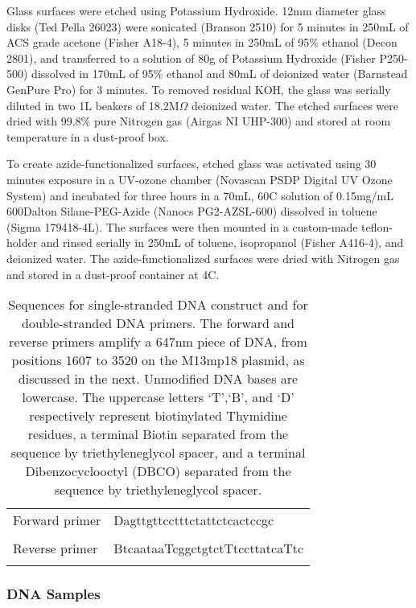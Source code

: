 \documentclass[%
  aip,12pt,tightenlines,
  amsthm,
 amsmath,amssymb
]{article}
\newcommand{\e}[0]{\\ \hline}
\newcommand{\tLabel}[1]{\label{table:#1}}
\newcommand{\sLabel}[1]{\label{section:#1}}
\newcommand{\firstp}[0]{}
\newcommand{\pl}[0]{\vspace{6pt}}
\newcommand{\supply}[2]{(#1 #2)}
\newcommand{\degreeC}[0]{\degree{}C}
\begin{document}
\firstp Glass surfaces were etched using Potassium Hydroxide. 12mm diameter glass disks \supply{Ted Pella}{26023} were sonicated \supply{Branson}{2510} for 5 minutes in 250mL of ACS grade acetone \supply{Fisher}{A18-4}, 5 minutes in 250mL of 95\% ethanol \supply{Decon}{2801}, and transferred to a solution of 80g of Potassium Hydroxide \supply{Fisher}{P250-500} dissolved in  170mL of 95\% ethanol and 80mL of deionized water \supply{Barnstead}{GenPure Pro} for 3 minutes. To removed residual KOH, the glass was serially diluted in two 1L beakers of 18.2M$\Omega$ deionized water. The etched surfaces were dried with 99.8\% pure Nitrogen gas \supply{Airgas}{NI UHP-300} and stored at room temperature in a dust-proof box. \pl

To create azide-functionalized surfaces, etched glass was activated using 30 minutes exposure in a UV-ozone chamber \supply{Novascan}{PSDP Digital UV Ozone System} and incubated for three hours in a 70mL, 60\degreeC{} solution of 0.15mg/mL 600Dalton Silane-PEG-Azide \supply{Nanocs}{PG2-AZSL-600} dissolved in toluene \supply{Sigma}{179418-4L}. The surfaces were then mounted in a custom-made teflon-holder and rinsed serially in 250mL of toluene, isopropanol \supply{Fisher}{A416-4}, and deionized water. The azide-functionalized surfaces were dried with Nitrogen gas and stored in a dust-proof container at 4\degreeC{}. \pl 


\begin{table}
\begin{tabularx}{\textwidth}{ l | l  }
\hline \hline
Forward primer & Dagttgttcctttctattctcactccgc \\ \e 
Reverse primer & BtcaataaTcggctgtctTtccttatcaTtc \\ \e 
\end{tabularx}
\caption[DNA primer sequences]{\tLabel{Sequences}Sequences for single-stranded DNA construct and for double-stranded DNA primers. The forward and reverse primers amplify a 647nm piece of DNA, from positions 1607 to 3520 on the M13mp18 plasmid, as discussed in the next. Unmodified DNA bases are lowercase. The uppercase letters `T',`B', and `D' respectively represent biotinylated Thymidine residues, a terminal Biotin separated from the sequence by triethyleneglycol spacer, and a terminal Dibenzocyclooctyl (DBCO) separated from the sequence by triethyleneglycol spacer.}
\end{table}

\subsubsection{\sLabel{Sample}DNA Samples}
\end{document}
